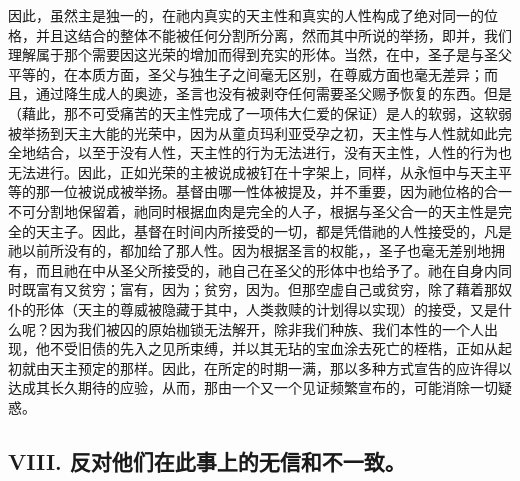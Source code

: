 因此，虽然主是独一的，在祂内真实的天主性和真实的人性构成了绝对同一的位格，并且这结合的整体不能被任何分割所分离，然而其中所说的举扬，即并，我们理解属于那个需要因这光荣的增加而得到充实的形体。当然，在中，圣子是与圣父平等的，在本质方面，圣父与独生子之间毫无区别，在尊威方面也毫无差异；而且，通过降生成人的奥迹，圣言也没有被剥夺任何需要圣父赐予恢复的东西。但是（藉此，那不可受痛苦的天主性完成了一项伟大仁爱的保证）是人的软弱，这软弱被举扬到天主大能的光荣中，因为从童贞玛利亚受孕之初，天主性与人性就如此完全地结合，以至于没有人性，天主性的行为无法进行，没有天主性，人性的行为也无法进行。因此，正如光荣的主被说成被钉在十字架上，同样，从永恒中与天主平等的那一位被说成被举扬。基督由哪一性体被提及，并不重要，因为祂位格的合一不可分割地保留着，祂同时根据血肉是完全的人子，根据与圣父合一的天主性是完全的天主子。因此，基督在时间内所接受的一切，都是凭借祂的人性接受的，凡是祂以前所没有的，都加给了那人性。因为根据圣言的权能，，圣子也毫无差别地拥有，而且祂在中从圣父所接受的，祂自己在圣父的形体中也给予了。祂在自身内同时既富有又贫穷；富有，因为；贫穷，因为。但那空虚自己或贫穷，除了藉着那奴仆的形体（天主的尊威被隐藏于其中，人类救赎的计划得以实现）的接受，又是什么呢？因为我们被囚的原始枷锁无法解开，除非我们种族、我们本性的一个人出现，他不受旧债的先入之见所束缚，并以其无玷的宝血涂去死亡的桎梏，正如从起初就由天主预定的那样。因此，在所定的时期一满，那以多种方式宣告的应许得以达成其长久期待的应验，从而，那由一个又一个见证频繁宣布的，可能消除一切疑惑。\par


\subsection{VIII. 反对他们在此事上的无信和不一致。}

